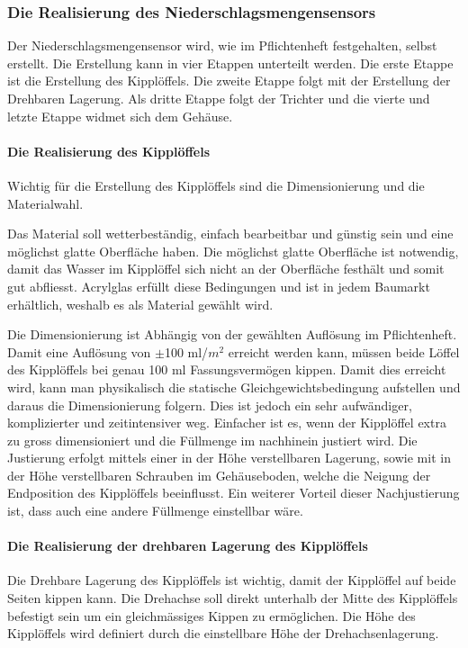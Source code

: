 \subsubsection*{Die Realisierung des Niederschlagsmengensensors}
Der Niederschlagsmengensensor wird, wie im Pflichtenheft festgehalten, selbst erstellt. Die Erstellung kann in vier Etappen unterteilt werden. Die erste Etappe ist die Erstellung des Kipplöffels. Die zweite Etappe folgt mit der Erstellung der Drehbaren Lagerung. Als dritte Etappe folgt der Trichter und die vierte und letzte Etappe widmet sich dem Gehäuse.
\paragraph{Die Realisierung des Kipplöffels}
Wichtig für die Erstellung des Kipplöffels sind die Dimensionierung und die Materialwahl.
 
Das Material soll wetterbeständig, einfach bearbeitbar und günstig sein und eine möglichst glatte Oberfläche haben. Die möglichst glatte Oberfläche ist notwendig, damit das Wasser im Kipplöffel sich nicht an der Oberfläche festhält und somit gut abfliesst. Acrylglas erfüllt diese Bedingungen und ist in jedem Baumarkt erhältlich, weshalb es als Material gewählt wird.

Die Dimensionierung ist Abhängig von der gewählten Auflösung im Pflichtenheft. Damit eine Auflösung von $\pm$100 ml/$m^2$ erreicht werden kann, müssen beide Löffel des Kipplöffels bei genau 100 ml Fassungsvermögen kippen. Damit dies erreicht wird, kann man physikalisch die statische Gleichgewichtsbedingung aufstellen und daraus die Dimensionierung folgern. Dies ist jedoch ein sehr aufwändiger, komplizierter und zeitintensiver weg. Einfacher ist es, wenn der Kipplöffel extra zu gross dimensioniert und die Füllmenge im nachhinein justiert wird. Die Justierung erfolgt mittels einer in der Höhe verstellbaren Lagerung, sowie mit in der Höhe verstellbaren Schrauben im Gehäuseboden, welche die Neigung der Endposition des Kipplöffels beeinflusst. Ein weiterer Vorteil dieser Nachjustierung ist, dass auch eine andere Füllmenge einstellbar wäre.

\paragraph{Die Realisierung der drehbaren Lagerung des Kipplöffels}
Die Drehbare Lagerung des Kipplöffels ist wichtig, damit der Kipplöffel auf beide Seiten kippen kann. Die Drehachse soll direkt unterhalb der Mitte des Kipplöffels befestigt sein um ein gleichmässiges Kippen zu ermöglichen. Die Höhe des Kipplöffels wird definiert durch die einstellbare Höhe der Drehachsenlagerung. 

